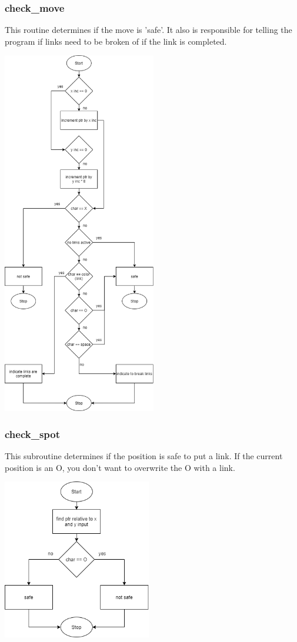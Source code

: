 \documentclass{article}
\begin{document}
    \subsubsection{check\_move}
        This routine determines if the move is 'safe'. It also 
        is responsible for telling the program if links need to 
        be broken of if the link is completed.
        \begin{center}
            {\includegraphics[height=16cm]{check_move.png}\centering} 
        \end{center}
        \newpage
        
    \subsubsection{check\_spot}
        This subroutine determines if the position is safe to put a link.
        If the current position is an O, you don't want to overwrite the 
        O with a link.
        \begin{center}
            {\includegraphics[height=7cm]{check_spot.png}\centering} 
        \end{center}
        \newpage
\end{document}
